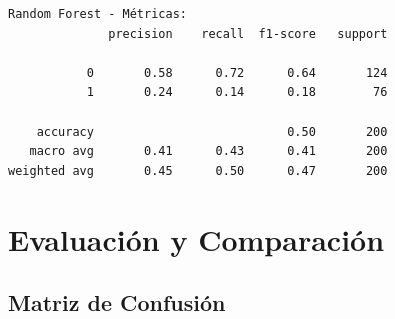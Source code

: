 \documentclass[
]{article}
\begin{document}
\begin{verbatim}
Random Forest - Métricas:
              precision    recall  f1-score   support

           0       0.58      0.72      0.64       124
           1       0.24      0.14      0.18        76

    accuracy                           0.50       200
   macro avg       0.41      0.43      0.41       200
weighted avg       0.45      0.50      0.47       200
\end{verbatim}

\section{Evaluación y Comparación}\label{evaluaciuxf3n-y-comparaciuxf3n}

\subsection{Matriz de Confusión}\label{matriz-de-confusiuxf3n}
\end{document}
